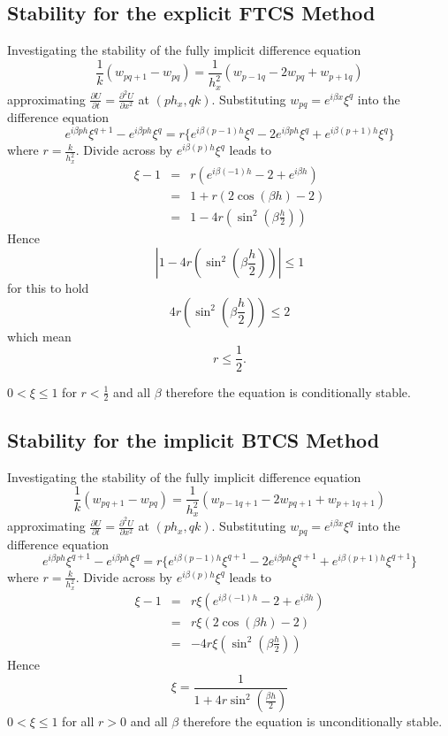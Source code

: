 \subsection{Stability for the explicit FTCS Method}
Investigating the stability of the fully implicit difference equation
\[\frac{1}{k}(w_{pq+1}-w_{pq})=\frac{1}{h_x^2}(w_{p-1q}-2w_{pq}+w_{p+1q})\]
approximating $\frac{\partial U}{\partial t}=\frac{\partial^2 U}{\partial x^2}$ at $(ph_x,qk)$. Substituting $w_{pq}=e^{i\beta x}\xi^{q}$ into the difference equation
\[e^{i\beta ph}\xi^{q+1}-e^{i\beta ph}\xi^{q}=
r\{
e^{i\beta (p-1)h}\xi^{q}
-2e^{i\beta ph}\xi^{q}
+
e^{i\beta (p+1)h}\xi^{q}
 \}
\]
where $r=\frac{k}{h_x^2}$. Divide across by $e^{i\beta (p)h}\xi^{q}$ leads to
\begin{eqnarray*} \xi-1&=&r(e^{i\beta (-1)h}
-2
+
e^{i\beta h})\\
&=& 1+r (2\cos(\beta h)-2)\\
&=&1-4r(\sin^2(\beta\frac{h}{2}))
\end{eqnarray*}
Hence \[\left| 1-4r(\sin^2(\beta\frac{h}{2}) )\right|\leq 1\]
for this to hold 
\[ 4r(\sin^2(\beta\frac{h}{2}) )\leq 2 \]
which mean 
\[ r\leq \frac{1}{2}. \] 

$0 < \xi \leq 1$ for  $r<\frac{1}{2}$ and all $\beta$ therefore the equation is conditionally stable.


\subsection{Stability for the implicit BTCS Method}
Investigating the stability of the fully implicit difference equation
\[\frac{1}{k}(w_{pq+1}-w_{pq})=\frac{1}{h_x^2}(w_{p-1q+1}-2w_{pq+1}+w_{p+1q+1})\]
approximating $\frac{\partial U}{\partial t}=\frac{\partial^2 U}{\partial x^2}$ at $(ph_x,qk)$. Substituting $w_{pq}=e^{i\beta x}\xi^{q}$ into the difference equation
\[e^{i\beta ph}\xi^{q+1}-e^{i\beta ph}\xi^{q}=
r\{
e^{i\beta (p-1)h}\xi^{q+1}
-2e^{i\beta ph}\xi^{q+1}
+
e^{i\beta (p+1)h}\xi^{q+1}
 \}
\]
where $r=\frac{k}{h_x^2}$. Divide across by $e^{i\beta (p)h}\xi^{q}$ leads to
\begin{eqnarray*} \xi-1&=&r\xi(e^{i\beta (-1)h}
-2
+
e^{i\beta h})\\
&=& r \xi(2\cos(\beta h)-2)\\
&=&-4r\xi(\sin^2(\beta\frac{h}{2}))
\end{eqnarray*}
Hence \[\xi = \frac{1}{1+4r\sin^2(\frac{\beta h}{2})}\]
$0 < \xi \leq 1$ for all $r>0$ and all $\beta$ therefore the equation is unconditionally stable.


